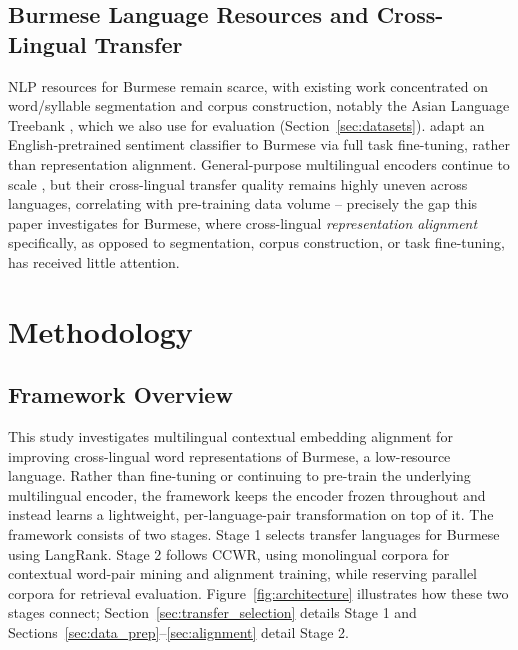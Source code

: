 \documentclass[11pt]{article}
\begin{document}
\subsection{Burmese Language Resources and Cross-Lingual Transfer}
NLP resources for Burmese remain scarce, with existing work concentrated on word/syllable segmentation \citep{ding-etal-2016-word} and corpus construction, notably the Asian Language Treebank \citep{thu-etal-2016-introducing}, which we also use for evaluation (Section~\ref{sec:datasets}). \citet{mao-etal-2022-burmese} adapt an English-pretrained sentiment classifier to Burmese via full task fine-tuning, rather than representation alignment. General-purpose multilingual encoders continue to scale \citep{devlin-etal-2019-bert,conneau-etal-2020-unsupervised,artetxe-schwenk-2019-massively}, but their cross-lingual transfer quality remains highly uneven across languages, correlating with pre-training data volume \citep{wu-dredze-2019-beto,wu-dredze-2020-languages} -- precisely the gap this paper investigates for Burmese, where cross-lingual \emph{representation alignment} specifically, as opposed to segmentation, corpus construction, or task fine-tuning, has received little attention.

\section{Methodology}

\subsection{Framework Overview}

This study investigates multilingual contextual embedding alignment for improving cross-lingual word representations of Burmese, a low-resource language. Rather than fine-tuning or continuing to pre-train the underlying multilingual encoder, the framework keeps the encoder frozen throughout and instead learns a lightweight, per-language-pair transformation on top of it. The framework consists of two stages. Stage 1 selects transfer languages for Burmese using LangRank. Stage 2 follows CCWR, using monolingual corpora for contextual word-pair mining and alignment training, while reserving parallel corpora for retrieval evaluation. Figure~\ref{fig:architecture} illustrates how these two stages connect; Section~\ref{sec:transfer_selection} details Stage 1 and Sections~\ref{sec:data_prep}--\ref{sec:alignment} detail Stage 2.
\end{document}
